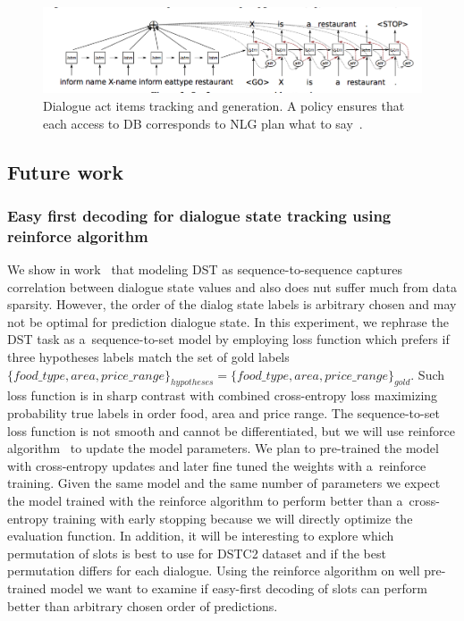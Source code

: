 \documentclass[11pt]{article}
\begin{document}
\begin{figure}[htpb]
    \centering
    \includegraphics[width=1.0\linewidth]{dusek_seq2seq}
    \caption{Dialogue act items tracking and generation. A policy ensures that each access to DB corresponds to NLG plan what to say~\cite{dusek_sequence2sequence_2016}.}
    \label{fig:dai_gen}
\end{figure}

\subsection{Future work}


\subsubsection*{Easy first decoding for dialogue state tracking using reinforce algorithm}
We show in work~\cite{platek_recurrent_2016} that modeling DST as sequence-to-sequence captures correlation between dialogue state values and also does nut suffer much from data sparsity.
However, the order of the dialog state labels is arbitrary chosen and may not be optimal for prediction dialogue state.
In this experiment, we rephrase the DST task as a~sequence-to-set model by employing loss function which prefers if three hypotheses labels match the set of gold labels $\{food\_type, area, price\_range\}_{hypotheses} = \{food\_type, area, price\_range\}_{gold}$.
Such loss function is in sharp contrast with combined cross-entropy loss maximizing probability true labels in order food, area and price range.
The sequence-to-set loss function is not smooth and cannot be differentiated, but we will use reinforce algorithm~\cite{williams_simple_1992} to update the model parameters.
We plan to pre-trained the model with cross-entropy updates and later fine tuned the weights with a~reinforce training.
Given the same model and the same number of parameters we expect the model trained with the reinforce algorithm to perform better than a~cross-entropy training with early stopping because we will directly optimize the evaluation function.
In addition, it will be interesting to explore which permutation of slots is best to use for DSTC2 dataset and if the best permutation differs for each dialogue.
Using the reinforce algorithm on well pre-trained model we want to examine if easy-first decoding of slots can perform better than arbitrary chosen order of predictions. 
\end{document}
